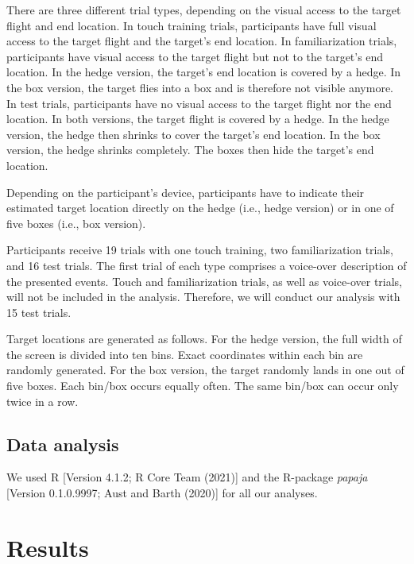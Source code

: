 \documentclass[
  english,
  man,floatsintext]{apa6}
\begin{document}
There are three different trial types,
depending on the visual access to the target flight and end location.
In touch training trials, participants have full visual access to the target flight
and the target's end location.
In familiarization trials, participants have visual access to the target flight
but not to the target's end location.
In the hedge version, the target's end location is covered by a hedge.
In the box version, the target flies into a box and is therefore not visible anymore.
In test trials, participants have no visual access to the target flight
nor the end location.
In both versions, the target flight is covered by a hedge.
In the hedge version, the hedge then shrinks to cover the target's end location.
In the box version, the hedge shrinks completely.
The boxes then hide the target's end location.

Depending on the participant's device,
participants have to indicate their estimated target location directly on the hedge
(i.e., hedge version) or in one of five boxes (i.e., box version).

Participants receive 19 trials with one touch training, two familiarization trials,
and 16 test trials.
The first trial of each type comprises a voice-over description of the presented events.
Touch and familiarization trials, as well as voice-over trials, will not be included in the analysis.
Therefore, we will conduct our analysis with 15 test trials.

Target locations are generated as follows.
For the hedge version, the full width of the screen is divided into ten bins.
Exact coordinates within each bin are randomly generated.
For the box version, the target randomly lands in one out of five boxes.
Each bin/box occurs equally often.
The same bin/box can occur only twice in a row.

\hypertarget{data-analysis}{%
\subsection{Data analysis}\label{data-analysis}}

We used R {[}Version 4.1.2; R Core Team (2021){]} and the R-package \emph{papaja} {[}Version 0.1.0.9997; Aust and Barth (2020){]} for all our analyses.

\hypertarget{results}{%
\section{Results}\label{results}}
\end{document}
